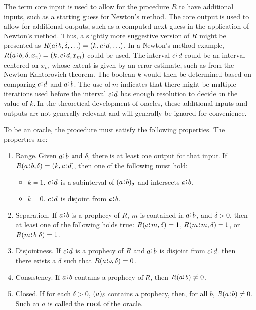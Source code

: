 \documentclass[12pt]{article}
\begin{document}
The term core input is used to allow for the procedure $R$ to have additional inputs, such as a starting guess for Newton's method. The core output is used to allow for additional outputs, such as a computed next guess in the application of Newton's method. Thus, a slightly more suggestive version of $R$ might be presented as $R(a \rint b, \delta, \ldots) = (k, c \rint d, \ldots)$. In a Newton's method example, $R(a \rint b, \delta, x_n) = (k, c \rint d, x_m)$ could be used. The interval $c \rint d$ could be an interval centered on $x_m$ whose extent is given by an error estimate, such as from the Newton-Kantorovich theorem. The boolean $k$ would then be determined based on comparing $c \rint d$ and $a \rint b$. The use of $m$ indicates that there might be multiple iterations used before the interval $c \rint d$ has enough resolution to decide on the value of $k$. In the theoretical development of oracles, these additional inputs and outputs are not generally relevant and will generally be ignored for convenience.  

To be an oracle, the procedure must satisfy the following properties.  The properties are:
\begin{enumerate}
    \item Range. Given $a \rint b$ and $\delta$, there is at least one output for that input. If $R(a\rint b, \delta) = (k, c\rint d)$, then one of the following must hold:
    \begin{itemize}
        \item $k=1$. $c\rint d$ is a subinterval of $\halo{a\rint b}$ and intersects $a\rint b$. 
        \item $k=0$. $c\rint d$ is disjoint from $a\rint b$.
    \end{itemize} 
    \item Separation. If $a\rint b$ is a prophecy of $R$, $m$ is contained in $a\rint b$, and $\delta > 0$, then at least one of the following holds true: $R(a \rint m, \delta) =1$, $R(m \rint m, \delta) = 1$, or $R(m \rint b, \delta) = 1$.
   \item Disjointness. 
   If $c\rint d$ is a prophecy of $R$ and $a\rint b$ is disjoint from $c\rint d$, then there exists a $\delta$ such that $R(a\rint b, \delta) = 0$.
    \item Consistency. If $a\rint b$ contains a prophecy of $R$, then $R(a\rint b) \neq 0$.
    \item Closed. 
    If for each $\delta >0$, $(a)_{\delta}$ contains a prophecy, then, for all $b$, $R(a\rint b) \neq 0$. Such an $a$ is called the \textbf{root} of the oracle. 
\end{enumerate}
\end{document}
